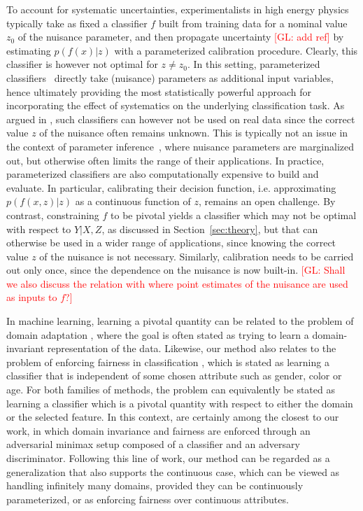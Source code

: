 \documentclass[twocolumn,superscriptaddress,aps]{revtex4-1}
\newcommand{\glnote}[1]{\textcolor{red}{[GL: #1]}}
\theoremstyle{plain}
\begin{document}
To account for systematic uncertainties, experimentalists in high energy physics
typically take as fixed a classifier $f$ built from training data for a nominal
value $z_0$ of the nuisance parameter, and then propagate uncertainty
\glnote{add ref} by estimating $p(f(x)|z)$ with a parameterized calibration
procedure. Clearly, this classifier is however not optimal for $z \neq z_0$. In
this setting, parameterized
classifiers~\citep{cranmer2015approximating,Baldi:2016fzo} directly take
(nuisance) parameters as additional input variables, hence ultimately providing
the most statistically powerful approach for incorporating the effect of
systematics on the underlying classification task.  As argued in
\citep{Neal:2007zz}, such classifiers can however not be used on real data since
the correct value $z$ of the nuisance often remains unknown. This is typically
not an issue in the context of parameter
inference~\citep{cranmer2015approximating}, where nuisance parameters are
marginalized out, but otherwise often limits the range of their applications. In
practice, parameterized classifiers  are also computationally expensive to build
and evaluate. In particular, calibrating their decision function, i.e.
approximating $p(f(x,z)|z)$ as a continuous function of $z$, remains an open
challenge. By contrast, constraining $f$ to be pivotal yields a classifier which
may not be optimal with respect to $Y|X,Z$, as discussed in
Section~\ref{sec:theory}, but that can otherwise be used in a wider range of
applications, since knowing the correct value $z$ of the nuisance is not
necessary. Similarly, calibration needs to be carried out only once, since  the
dependence on the nuisance is now built-in. \glnote{Shall we also discuss the
relation with \citep{Neal:2007zz} where point estimates of the nuisance are used
as inputs to $f$?}

In machine learning, learning a pivotal quantity can be related to the problem
of domain adaptation
\citep{blitzer2006domain,pan2011domain,gopalan2011domain,gong2013connecting,baktashmotlagh2013unsupervised,ganin2014unsupervised},
where the goal is often stated as trying to learn a domain-invariant
representation of the data. Likewise, our method also relates to the problem of
enforcing fairness in classification \citep{zemel2013learning,EdwardsS15}, which
is stated as learning a classifier that is independent of some chosen attribute
such as gender, color or age. For both families of methods, the problem can
equivalently be stated as learning a classifier which is a pivotal quantity with
respect to either the domain or the selected feature. In this context,
\citep{ganin2014unsupervised,EdwardsS15} are certainly among the closest to our
work, in which domain invariance and fairness are enforced through an
adversarial minimax setup composed of a classifier and an adversary
discriminator. Following this line of work, our method can be regarded as a
generalization that also supports the continuous case, which can be viewed as
handling infinitely many domains, provided they can be continuously
parameterized, or as enforcing fairness over continuous attributes.
\end{document}
